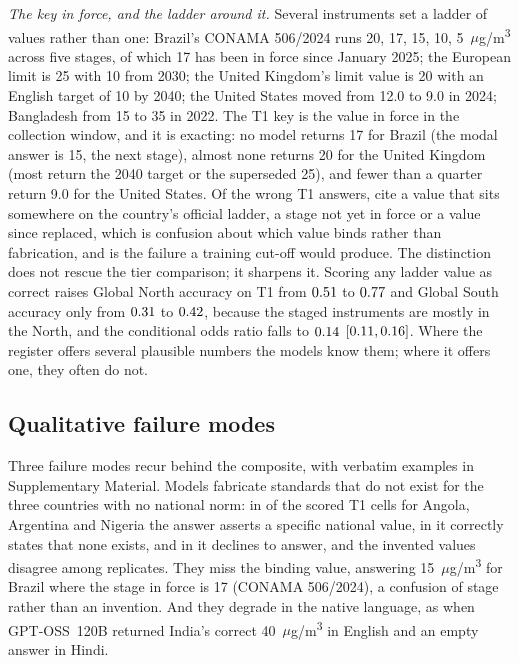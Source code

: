 \emph{The key in force, and the ladder around it.} Several instruments set a
ladder of values rather than one: Brazil's CONAMA 506/2024 runs 20, 17, 15, 10,
5~$\mu$g/m\textsuperscript{3} across five stages, of which 17 has been in force
since January 2025; the European limit is 25 with 10 from 2030; the United
Kingdom's limit value is 20 with an English target of 10 by 2040; the United
States moved from 12.0 to 9.0 in 2024; Bangladesh from 15 to 35 in 2022. The
T1 key is the value in force in the collection window, and it is exacting: no
model returns 17 for Brazil (the modal answer is 15, the next stage), almost
none returns 20 for the United Kingdom (most return the 2040 target or the
superseded 25), and fewer than a quarter return 9.0 for the United States. Of
the \nincorrectn{} wrong T1 answers, \nladderhit{} cite a value that sits
somewhere on the country's official ladder, a stage not yet in force or a value
since replaced, which is confusion about which value binds rather than
fabrication, and is the failure a training cut-off would produce. The
distinction does not rescue the tier comparison; it sharpens it. Scoring any
ladder value as correct raises Global North accuracy on T1 from $0.51$ to
$0.77$ and Global South accuracy only from $0.31$ to $0.42$,
because the staged instruments are mostly in the North, and the conditional
odds ratio falls to $0.14$ $[0.11,0.16]$. Where the register offers
several plausible numbers the models know them; where it offers one, they
often do not.

\subsection{Qualitative failure modes}
\label{sec:results:qual}

Three failure modes recur behind the composite, with verbatim examples in
Supplementary Material. Models fabricate standards that do not exist for the
three countries with no national norm: in \nnsfab{} of the \nnscells{} scored T1
cells for Angola, Argentina and Nigeria the answer asserts a specific national
value, in \nnsabst{} it correctly states that none exists, and in \nnsdk{} it
declines to answer, and the invented values disagree among replicates. They miss
the binding value, answering 15~$\mu$g/m\textsuperscript{3} for Brazil where
the stage in force is 17 (CONAMA 506/2024), a confusion of stage rather than an
invention. And they degrade in the native language, as when GPT-OSS~120B
returned India's correct 40~$\mu$g/m\textsuperscript{3} in English and an
empty answer in Hindi.

